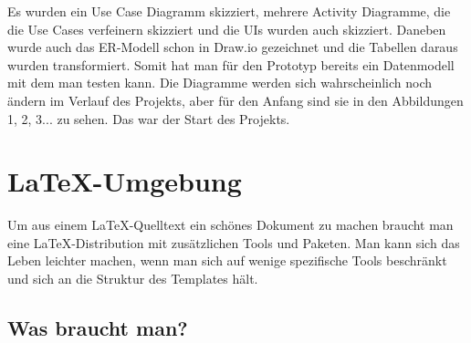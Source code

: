 \documentclass[11pt,a4paper]{report}
\begin{document}
Es wurden ein Use Case Diagramm skizziert, mehrere Activity Diagramme, die die Use Cases verfeinern skizziert und die UIs wurden auch skizziert. Daneben wurde auch das ER-Modell schon in Draw.io gezeichnet und die Tabellen daraus wurden transformiert. Somit hat man für den Prototyp bereits ein Datenmodell mit dem man testen kann. Die Diagramme werden sich wahrscheinlich noch ändern im Verlauf des Projekts, aber für den Anfang sind sie in den Abbildungen 1, 2, 3... zu sehen. Das war der Start des Projekts.




\chapter{\LaTeX-Umgebung} \label{chap:latex}

Um aus einem \LaTeX-Quelltext ein schönes Dokument zu machen braucht man 
eine \LaTeX-Distribution mit zusätzlichen Tools und Paketen. 
Man kann sich das Leben leichter machen, wenn man sich auf wenige spezifische
Tools beschränkt und sich an die Struktur des Templates hält.


\section{Was braucht man?} \label{sec:was}
\end{document}
